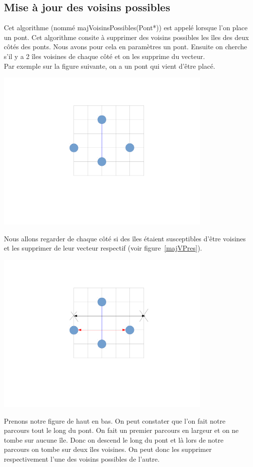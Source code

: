 \documentclass[french]{article}
\begin{document}
    \subsection{\Large Mise à jour des voisins possibles}
    Cet algorithme (nommé majVoisinsPossibles(Pont*)) est appelé lorsque l'on place un pont. Cet algorithme consite à supprimer des voisins possibles les îles des deux côtés des ponts. Nous avons pour cela en paramètres un pont. Ensuite on cherche s'il y a 2 îles voisines de chaque côté et on les supprime du vecteur. \\
    Par exemple sur la figure suivante, on a un pont qui vient d'être placé.
    \centerline{\includegraphics[width=0.8\textwidth]{majVP.pdf}}
    \label{majVP} 
    \vspace{0.5cm}
    Nous allons regarder de chaque côté si des îles étaient susceptibles d'être voisines et les supprimer de leur vecteur respectif (voir figure~\ref{majVPres}).
    \centerline{\includegraphics[width=0.8\textwidth]{majVPres.pdf}}
    \label{majVPres} 
    \vspace{0.5cm}
    Prenons notre figure de haut en bas. On peut constater que l'on fait notre parcours tout le long du pont. On fait un premier parcours en largeur et on ne tombe sur aucune île. Donc on descend le long du pont et là lors de notre parcours on tombe sur deux îles voisines. On peut donc les supprimer respectivement l'une des voisins possibles de l'autre.
\end{document}
